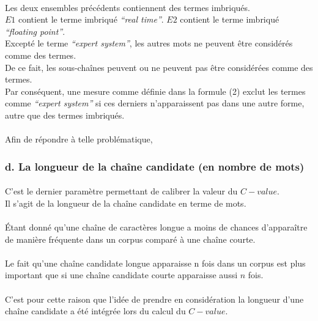 \documentclass[12pt, a4paper, oneside]{book}
\begin{document}
\paragraph{}
Les deux ensembles précédents contiennent des termes imbriqués.\\
$E1$ contient le terme imbriqué \emph{“real time”}. $E2$ contient le terme imbriqué \emph{“floating point”}.\\
Excepté le terme \emph{“expert system”}, les autres mots ne peuvent être considérés comme des termes.\\
De ce fait, les sous-chaînes peuvent ou ne peuvent pas être considérées comme des termes.\\
Par conséquent, une mesure comme définie dans la formule (2) exclut les termes comme  \emph{“expert system”} si ces derniers n'apparaissent pas dans une autre forme, autre que des termes imbriqués.
\paragraph{}
Afin de répondre à telle problématique, 



\subsubsection{d. La longueur de la chaîne candidate (en nombre de mots)}

\paragraph{}
C'est le dernier paramètre permettant de calibrer la valeur du $C-value$.\\
Il s'agit de la longueur de la chaîne candidate en terme de mots.
\paragraph{}
Étant donné qu'une chaîne de caractères longue a moins de chances d'apparaître de manière fréquente dans un corpus comparé à une chaîne courte. 
\paragraph{}
Le fait qu'une chaîne candidate longue apparaisse n fois dans un corpus est plus important que si une chaîne candidate courte apparaisse aussi $n$ fois.
\paragraph{}
C'est pour cette raison que l'idée de prendre en considération la longueur d'une chaîne candidate a été intégrée lors du calcul du $C-value$.
\end{document}
